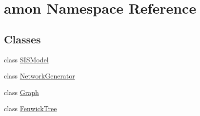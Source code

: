 \hypertarget{namespaceamon}{\section{amon Namespace Reference}
\label{namespaceamon}
}
\subsection*{Classes}
\begin{DoxyCompactItemize}
\item 
class \hyperlink{classamon_1_1_s_i_s_model}{S\-I\-S\-Model}
\item 
class \hyperlink{classamon_1_1_network_generator}{Network\-Generator}
\item 
class \hyperlink{classamon_1_1_graph}{Graph}
\item 
class \hyperlink{classamon_1_1_fenwick_tree}{Fenwick\-Tree}
\end{DoxyCompactItemize}

